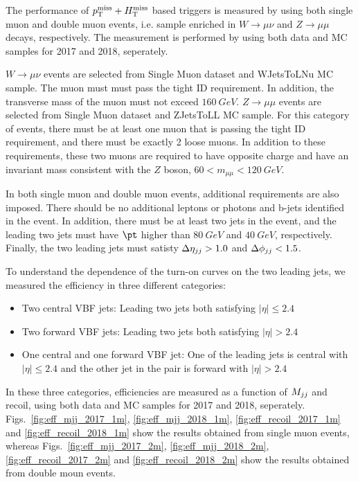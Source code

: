 The performance of $p_{\mathrm{T}}^{\mathrm{miss}} + H_{\mathrm{T}}^{\mathrm{miss}}$ based triggers is measured by using both single muon and double muon events, i.e. sample enriched in
$W \rightarrow \mu\nu$ and $Z \rightarrow \mu\mu$ decays, respectively. The measurement is performed by using both data and MC samples 
for 2017 and 2018, seperately.

$W \rightarrow \mu\nu$ events are selected from Single Muon dataset and WJetsToLNu MC sample. %
The muon must must pass the tight ID requirement. In addition, the transverse mass of the muon must not exceed $160 \ GeV$. 
$Z \rightarrow \mu\mu$ events are selected from Single Muon dataset and ZJetsToLL MC sample. %
For this category of events, there must be at least one muon that is passing the tight ID requirement, and there must be exactly 
2 loose muons. In addition to these requirements, these two muons are required to have opposite charge and have an invariant mass 
consistent with the $Z$ boson, $60 < m_{\mu\mu} < 120 \ GeV$.

In both single muon and double muon events, additional requirements are also imposed. There should be no additional leptons or photons and
b-jets identified in the event. In addition, there must be at least two jets in the event, and the leading two jets must have $\pt$ higher
than $80 \ GeV$ and $40 \ GeV$, respectively. Finally, the two leading jets must satisty $\Delta \eta_{jj} > 1.0$ and $\Delta \phi_{jj} < 1.5$.

To understand the dependence of the turn-on curves on the two leading jets, we measured the efficiency in three different categories:

\begin{itemize}
    \item Two central VBF jets: Leading two jets both satisfying $|\eta| \leq 2.4$
    \item Two forward VBF jets: Leading two jets both satisfying $|\eta| > 2.4$
    \item One central and one forward VBF jet: One of the leading jets is central with $|\eta| \leq 2.4$ and the other jet in the pair is forward 
    with $|\eta| > 2.4$
\end{itemize}

In these three categories, efficiencies are measured as a function of $M_{jj}$ and recoil, using both data and MC samples for 2017 and 2018,
seperately. Figs.~\ref{fig:eff_mjj_2017_1m}, \ref{fig:eff_mjj_2018_1m}, \ref{fig:eff_recoil_2017_1m} and \ref{fig:eff_recoil_2018_1m} show 
the results obtained from single muon events, whereas Figs.~\ref{fig:eff_mjj_2017_2m}, \ref{fig:eff_mjj_2018_2m}, 
\ref{fig:eff_recoil_2017_2m} and \ref{fig:eff_recoil_2018_2m} show the results obtained from double moun events.

